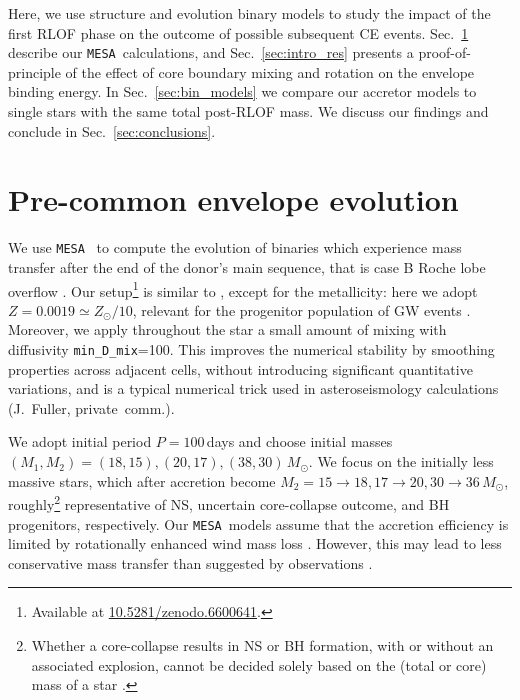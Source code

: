 \documentclass[twocolumn,twocolappendix,trackchanges]{aastex63}
\newcommand{\code}[1]{\texttt{#1}}
\newcommand{\mesa}{\code{MESA}}
\DeclareRobustCommand{\Secref}[1]{Sec.~\ref{#1}}
\begin{document}
Here, we use structure and evolution binary models to study the impact
of the first RLOF phase on the outcome of possible subsequent CE
events. \Secref{sec:methods} describe our \mesa\ calculations, and
\Secref{sec:intro_res} presents a proof-of-principle of the effect of
core boundary mixing and rotation on the envelope binding energy. In
\Secref{sec:bin_models} we compare our accretor models to single stars
with the same total post-RLOF mass. We discuss our findings and
conclude in \Secref{sec:conclusions}.

\section{Pre-common envelope evolution}
\label{sec:methods}

We use \mesa\
\citep[version 15140,][]{paxton:2011, paxton:2013, paxton:2015,
  paxton:2018, paxton:2011} to compute the evolution of binaries which
experience mass transfer after the end of the donor's main sequence,
that is case B Roche lobe overflow \citep[RLOF,][]{kippenhahn:1967}.
Our setup\footnote{Available at \url{10.5281/zenodo.6600641}.} is similar to
\cite{renzo:2021zoph}, except for the
metallicity: here we adopt $Z=0.0019\simeq Z_\odot/10$, relevant for
the progenitor population of GW events \citep[e.g.,][]{vanson:2021}. Moreover, we apply
throughout the star a small amount of mixing with diffusivity
\texttt{min\_D\_mix}=100. This improves the numerical stability by
smoothing properties across adjacent cells, without introducing
significant quantitative variations, and is a typical numerical trick
used in asteroseismology calculations (J.~Fuller, private~comm.).

We adopt initial period $P=100$\,days and choose initial masses
$(M_{1}, M_{2}) = (18, 15), (20, 17), (38, 30)\,M_\odot$. We focus on
the initially less massive stars, which after accretion become
$M_2=15\rightarrow 18, 17\rightarrow 20, 30\rightarrow 36\,M_\odot$, roughly\footnote{Whether a
  core-collapse results in NS or BH formation, with or without an
  associated explosion, cannot be decided solely based on the (total
  or core) mass of a star \citep[e.g.,][]{oconnor:11, farmer:16,
    patton:20, zapartas:21b, patton:22}. } representative of NS,
uncertain core-collapse outcome, and BH progenitors, respectively. Our \mesa\ models
assume that the accretion efficiency is limited by rotationally
enhanced wind mass loss \citep[e.g.,][]{sravan:2019, wang:2020,
  renzo:2021zoph, sen:2022}. However, this may lead to less
conservative mass transfer than suggested by observations
\citep[e.g.,][]{wang:2021a}.
\end{document}
